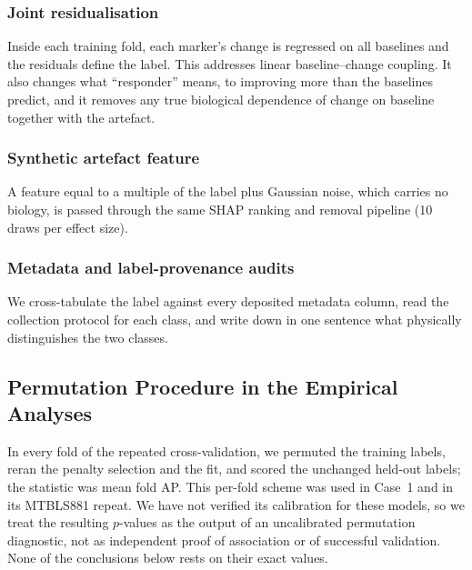 \documentclass[conference]{IEEEtran}
\begin{document}
\subsubsection{Joint residualisation} Inside each training fold, each
marker's change is regressed on all baselines and the residuals define the
label. This addresses linear baseline--change coupling. It also changes what
``responder'' means, to improving more than the baselines predict, and it
removes any true biological dependence of change on baseline together with
the artefact.

\subsubsection{Synthetic artefact feature} A feature equal to a multiple of
the label plus Gaussian noise, which carries no biology, is passed through
the same SHAP ranking and removal pipeline (10 draws per effect size).

\subsubsection{Metadata and label-provenance audits} We cross-tabulate the
label against every deposited metadata column, read the collection protocol
for each class, and write down in one sentence what physically distinguishes
the two classes.

\subsection{Permutation Procedure in the Empirical Analyses}
In every fold of the repeated cross-validation, we permuted the training
labels, reran the penalty selection and the fit, and scored the unchanged
held-out labels; the statistic was mean fold AP. This per-fold scheme was
used in Case~1 and in its MTBLS881 repeat. We have not verified its
calibration for these models, so we treat the resulting $p$-values as the
output of an uncalibrated permutation diagnostic, not as independent proof
of association or of successful validation. None of the conclusions below
rests on their exact values.
\end{document}
